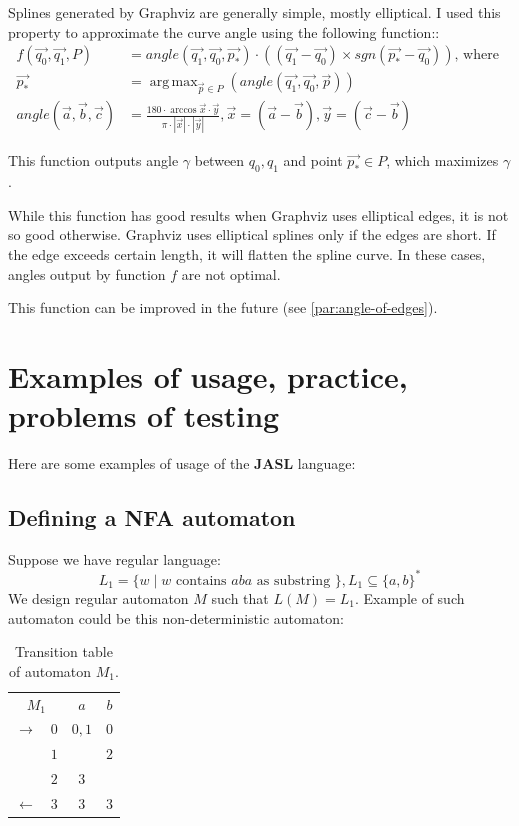 \documentclass{ctuthesis}
\DeclareMathOperator*{\argmax}{arg\,max}
\begin{document}
Splines generated by Graphviz are generally simple, mostly elliptical. I used this property to approximate the curve angle using the following function::
\begin{align*}
	f(\vec{q_0}, \vec{q_1}, P) &= angle(\vec{q_1}, \vec{q_0}, \vec{p_*}) \cdot ((\vec{q_1} - \vec{q_0})\times sgn(\vec{p_*} - \vec{q_0})) \text{, where } \\
	\vec{p_*} &= \argmax_{\vec{p} \in P} (angle(\vec{q_1}, \vec{q_0}, \vec{p})) \\
	angle(\vec{a}, \vec{b}, \vec{c}) &= \frac{
		180 \cdot \arccos{ \vec{x} \cdot \vec{y} }}{ \pi \cdot |\vec{x}| \cdot |\vec{y}| }, \vec{x} = (\vec{a} - \vec{b}), \vec{y} = (\vec{c}-\vec{b})
\end{align*}

This function outputs angle $\gamma$ between $q_0, q_1$ and point $\vec{p_*} \in P$, which maximizes $\gamma$. 

While this function has good results when Graphviz uses elliptical edges, it is not so good otherwise. Graphviz uses elliptical splines only if the edges are short. If the edge exceeds certain length, it will flatten the spline curve. In these cases, angles output by function $f$ are not optimal. 

This function can be improved in the future (see \ref{par:angle-of-edges}).

\chapter{Examples of usage, practice, problems of testing}
Here are some examples of usage of the \textbf{JASL} language: 

\section{Defining a NFA automaton}
\label{sec:example_NFA}
Suppose we have regular language: 
\begin{equation*}
L_1 = \{w \mid w \text{ contains } aba \text{ as substring }\}, L_1 \subseteq \{a, b\}^*
\end{equation*} 
We design regular automaton $M$ such that $L(M) = L_1$. Example of such automaton could be this non-deterministic automaton:
\begin{table}[H]
\begin{ctucolortab}
\begin{tabular}{cc|cc}
\multicolumn{2}{c}{\bfseries $M_1$} & \bfseries $a$ & \bfseries $b$ \\\Midrule
$\rightarrow$ 	& $0$ & $0,1$ 	& $0$  \\
				& $1$ &  	& $2$  \\
				& $2$ & $3$		&  \\
$\leftarrow$	& $3$ & $3$		& $3$ 
\end{tabular}
\end{ctucolortab}
\caption{Transition table of automaton $M_1$.}
\label{fig:examples_NFA_table}
\end{table} 
\end{document}
